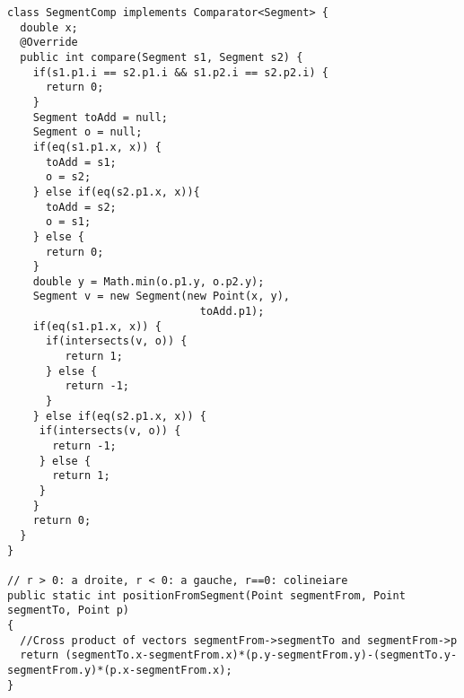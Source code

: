 \begin{lstlisting}
class SegmentComp implements Comparator<Segment> {
  double x;
  @Override
  public int compare(Segment s1, Segment s2) {
    if(s1.p1.i == s2.p1.i && s1.p2.i == s2.p2.i) {
      return 0;
    }
    Segment toAdd = null;
    Segment o = null;
    if(eq(s1.p1.x, x)) {
      toAdd = s1;
      o = s2;		
    } else if(eq(s2.p1.x, x)){
      toAdd = s2;
      o = s1;
    } else {
      return 0;
    }
    double y = Math.min(o.p1.y, o.p2.y);
    Segment v = new Segment(new Point(x, y),
                              toAdd.p1);
    if(eq(s1.p1.x, x)) {
      if(intersects(v, o)) {
         return 1;
      } else {
         return -1;
      }
    } else if(eq(s2.p1.x, x)) {
	 if(intersects(v, o)) {
	   return -1;
     } else {
       return 1;
     }
    }
    return 0;
  }
}

// r > 0: a droite, r < 0: a gauche, r==0: colineiare
public static int positionFromSegment(Point segmentFrom, Point segmentTo, Point p)
{
  //Cross product of vectors segmentFrom->segmentTo and segmentFrom->p
  return (segmentTo.x-segmentFrom.x)*(p.y-segmentFrom.y)-(segmentTo.y-segmentFrom.y)*(p.x-segmentFrom.x);
}
\end{lstlisting}
